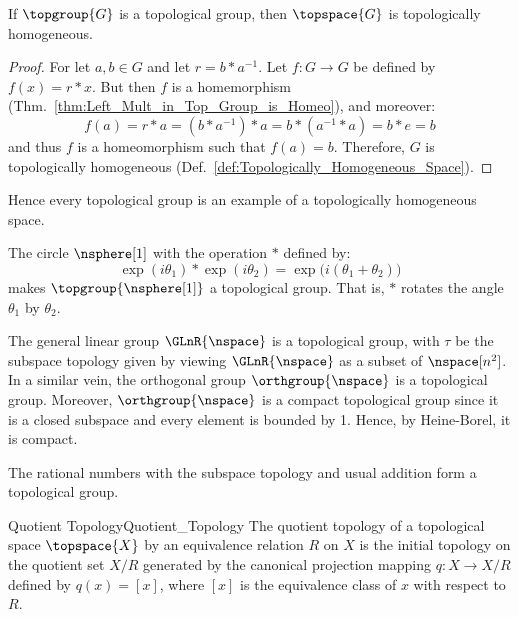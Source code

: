 \documentclass{article}                                                        %
\begin{document}
        \begin{theorem}
            \label{thm:Top_Groups_are_Homogeneous}%
            If $\topgroup{G}$ is a topological group, then $\topspace{G}$ is
            topologically homogeneous.
        \end{theorem}
        \begin{proof}
            For let $a,b\in{G}$ and let $r=b*a^{\minus{1}}$. Let
            $f:G\rightarrow{G}$ be defined by $f(x)=r*x$. But then $f$ is a
            homemorphism (Thm.~\ref{thm:Left_Mult_in_Top_Group_is_Homeo}), and
            moreover:
            \begin{equation}
                f(a)=r*a=(b*a^{\minus{1}})*a=b*(a^{\minus{1}}*a)=b*e=b
            \end{equation}
            and thus $f$ is a homeomorphism such that $f(a)=b$. Therefore, $G$
            is topologically homogeneous
            (Def.~\ref{def:Topologically_Homogeneous_Space}).
        \end{proof}
        Hence every topological group is an example of a topologically
        homogeneous space.
        \begin{example}
            The circle $\nsphere[1]$ with the operation $*$ defined by:
            \begin{equation}
                \exp(i\theta_{1})*\exp(i\theta_{2})=
                \exp\big(i(\theta_{1}+\theta_{2})\big)
            \end{equation}
            makes $\topgroup{\nsphere[1]}$ a topological group. That is,
            $*$ rotates the angle $\theta_{1}$ by $\theta_{2}$.
        \end{example}
        \begin{example}
            The general linear group $\GLnR{\nspace}$ is a topological group,
            with $\tau$ be the subspace topology given by viewing
            $\GLnR{\nspace}$ as a subset of $\nspace[n^{2}]$. In a similar vein,
            the orthogonal group $\orthgroup{\nspace}$ is a topological group.
            Moreover, $\orthgroup{\nspace}$ is a compact topological group since
            it is a closed subspace and every element is bounded by 1. Hence,
            by Heine-Borel, it is compact.
        \end{example}
        \begin{example}
            The rational numbers with the subspace topology and usual addition
            form a topological group.
        \end{example}
        \begin{fdefinition}{Quotient Topology}{Quotient_Topology}
            The quotient topology of a topological space $\topspace{X}$ by an
            equivalence relation $R$ on $X$ is the initial topology on the
            quotient set $X/R$ generated by the canonical projection mapping
            $q:X\rightarrow{X}/R$ defined by $q(x)=[x]$, where $[x]$ is the
            equivalence class of $x$ with respect to $R$.
        \end{fdefinition}
\end{document}
